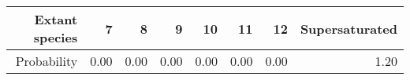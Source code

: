 \begin{table}[ht]
\centering
\begin{tabular}{rrrrrrrr}
  \hline
Extant species & 7 & 8 & 9 & 10 & 11 & 12 & Supersaturated \\ 
  \hline
Probability & 0.00 & 0.00 & 0.00 & 0.00 & 0.00 & 0.00 & 1.20 \\ 
   \hline
\end{tabular}
\end{table}
